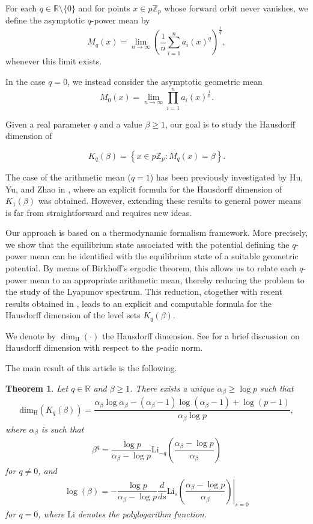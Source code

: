 \documentclass[11pt]{amsart}
\newtheorem{theorem}{Theorem}[section]
\theoremstyle{remark}
\numberwithin{equation}{section}
\newcommand{\R}{\mathbb{R}}
\newcommand{\Z}{\mathbb{Z}}
\newcommand{\Zp}{\mathbb{Z}_p}
\newcommand{\Li}{\mathrm{Li}}
\newcommand{\dimH}{\mathrm{dim}_{\mathrm{H}}}
\begin{document}
For each $q\in \R\setminus\{0\}$ and for points $x\in p\Zp$ whose forward orbit never vanishes, we define the asymptotic $q$-power mean by   
\[M_{q}(x)=\lim_{n\to \infty} \left(\frac{1}{n}\sum^{n}_{i=1}a_{i}(x)^{q}\right)^{\frac{1}{q}},\]
whenever this limit exists.

In the case $q=0$, we instead consider the asymptotic geometric mean
\[M_0(x)=\lim_{n\to \infty}\prod_{i=1}^{n}a_{i}(x)^{\frac{1}{n}}.\] 


Given a real parameter $q$ and a value $\beta\geq 1$, our goal is to study the Hausdorff dimension of

\[K_q(\beta)=\left\{x\in p\Z_p: M_{q}(x)=\beta \right\}.\]

The case of the arithmetic mean ($q=1$) has been previously investigated by Hu, Yu, and Zhao in \cite{hyz}, where an explicit formula for the Hausdorff dimension of $K_{1}(\beta)$ was obtained. However, extending these results to general power means is far from straightforward and requires new ideas.

Our approach is based on a thermodynamic formalism framework. More precisely, we show that the equilibrium state associated with the potential defining the $q$-power mean can be identified with the equilibrium state of a suitable geometric potential. By means of Birkhoff's ergodic theorem, this allows us to relate each $q$-power mean to an appropriate arithmetic mean, thereby reducing the problem to the study of the Lyapunov spectrum. This 
reduction, ctogether with recent results obtained in \cite[Theorem 1.1]{paper1}, leads to an explicit and computable formula for the Hausdorff dimension of the level sets $K_q(\beta)$.

We denote by $\dim_\mathrm{H}(\cdot)$ the Hausdorff dimension. See \cite[Section 2]{paper1} for a brief discussion on Hausdorff dimension with respect to the $p$-adic norm.

The main result of this article is the following.

\begin{theorem}\label{MainTheoremPaper2}
    Let $q\in \mathbb{R}$ and $\beta\geq 1$. There exists a unique $\alpha_{\beta}\geq \log p$ such that 
    \begin{align}\label{EcuTheoremPrincipal 1}
        \dimH\left(K_{q}(\beta)\right)=\dfrac{\alpha_{\beta}\log\alpha_{\beta}-(\alpha_{\beta}-1)\log(\alpha_{\beta}-1)+\log(p-1)}{\alpha_{\beta} \log p},
    \end{align}where $\alpha_{\beta}$ is such that 
    \begin{align}\label{EcuTheoremPrincipal 2}
        \beta^{q}=
            \dfrac{\log p}{\alpha_\beta-\log p}\Li_{-q}\left(\dfrac{\alpha_\beta-\log p}{\alpha_\beta}\right)
    \end{align}for $q\neq 0$, and
    \begin{align}\label{EcuTheoremPrincipal 21}
        \log(\beta)=-\dfrac{\log p}{\alpha_{\beta}-\log p}\left.\dfrac{d}{ds}\Li_{s}\left(\dfrac{\alpha_\beta-\log p}{\alpha_\beta}\right)\right|_{s=0}
    \end{align} for $q=0$, where $\Li$ denotes the polylogarithm function.
\end{theorem}
\end{document}
